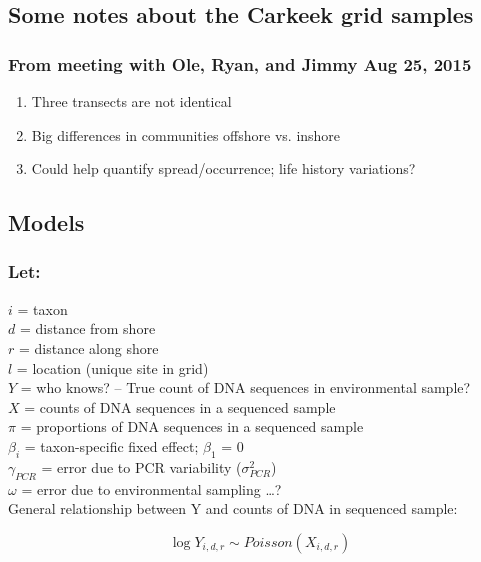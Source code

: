 \documentclass[12pt]{article}
\begin{document}
   
\subsection*{Some notes about the Carkeek grid samples}

\subsubsection*{From meeting with Ole, Ryan, and Jimmy Aug 25, 2015}

\begin{enumerate}
    \item Three transects are not identical
    \item Big differences in communities offshore vs. inshore
    \item Could help quantify spread/occurrence; life history variations?
\end{enumerate}


\subsection*{Models}
\subsubsection*{Let:}
$i$	=	taxon\\
$d$	=	distance from shore\\
$r$	=	distance along shore\\
$l$	=	location (unique site in grid)\\
$Y$	=	who knows? -- True count of DNA sequences in environmental sample?\\
$X$	=	counts of DNA sequences in a sequenced sample\\
$\pi$	=	proportions of DNA sequences in a sequenced sample\\
$\beta_i$	=	taxon-specific fixed effect; $\beta_1$ = 0\\
$\gamma_{PCR}$	=	error due to PCR variability ($\sigma^2_{PCR}$)\\
$\omega$	=	error due to environmental sampling \ldots ?\\


General relationship between Y and counts of DNA in sequenced sample:

\begin{equation}
\log Y_{i,d,r} \sim Poisson(X_{i,d,r})
\end{equation}

\end{document}
